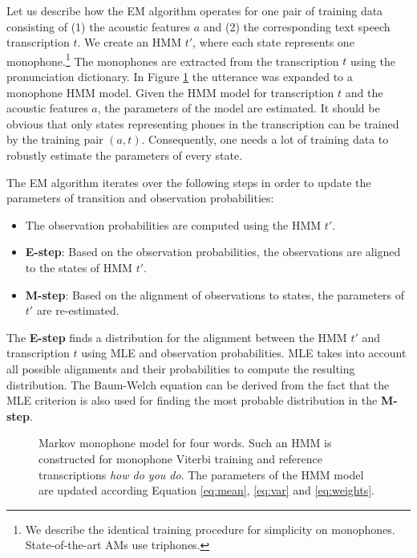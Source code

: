 
Let us describe how the \ac{EM} algorithm operates for one pair of training data consisting of (1) the acoustic features $a$ and (2) the corresponding text speech transcription $t$. We create an \ac{HMM} $t'$, where each state represents one monophone.\footnote{We describe the identical training procedure for simplicity on monophones. State-of-the-art \acp{AM} use triphones.} The monophones are extracted from the transcription $t$ using the pronunciation dictionary. In Figure \ref{fig:hmm_words} the utterance  was expanded to a monophone \ac{HMM} model. Given the \ac{HMM} model for transcription $t$ and the acoustic features $a$, the parameters of the model are estimated. It should be obvious that only states representing phones in the transcription can be trained by the training pair $(a, t)$. Consequently, one needs a lot of training data to robustly estimate the parameters of every state.

The \ac{EM} algorithm iterates over the following steps in order to update the parameters of transition and observation probabilities:

\begin{itemize}
    \item The observation probabilities are computed using the \ac{HMM} $t'$. 
    \item {\bf E-step}: Based on the observation probabilities, the observations are aligned to the states of \ac{HMM} $t'$. 
    \item {\bf M-step}: Based on the alignment of observations to states, the parameters of $t'$ are re-estimated. 
\end{itemize}

The {\bf E-step} finds a distribution for the alignment between the \ac{HMM} $t'$ and transcription $t$ using \ac{MLE}\cite{gopinath1998maximum} and observation probabilities. \ac{MLE} takes into account all possible alignments and their probabilities to compute the resulting distribution. The Baum-Welch equation can be derived from the fact that the \ac{MLE} criterion is also used for finding the most probable distribution in the {\bf M-step}.\cite{huang2001spoken} %

\begin{figure}[!htp]
    \begin{center}
    
    \caption{Markov monophone model for four words. Such an \ac{HMM} is constructed for monophone Viterbi training and reference transcriptions \textit{how do you do}. The parameters of the \ac{HMM} model are updated according Equation \ref{eq:mean}, \ref{eq:var} and \ref{eq:weights}.}
    \label{fig:hmm_words} 
    \end{center}
\end{figure}

